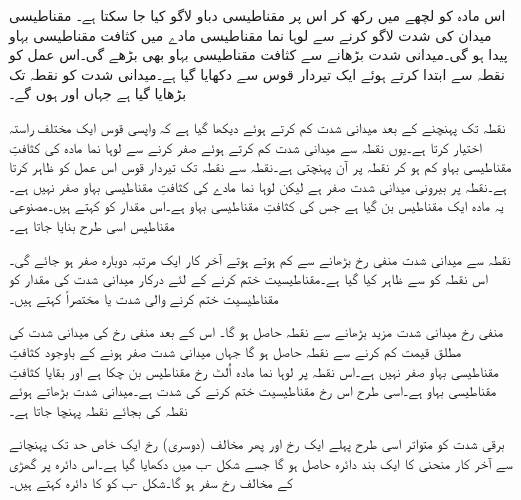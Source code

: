 اس مادہ کو لچھے میں رکھ کر اس پر مقناطیسی دباو لاگو کیا جا سکتا ہے۔ مقناطیسی میدان کی شدت   لاگو کرنے سے لوہا نما مقناطیسی مادے میں کثافت مقناطیسی بہاو   پیدا ہو گی۔میدانی شدت بڑھانے سے کثافت مقناطیسی بہاو بھی بڑھے گی۔اس عمل کو نقطہ   سے ابتدا کرتے ہوئے ایک تیردار قوس سے دکھایا گیا ہے۔میدانی شدت کو نقطہ   تک بڑھایا گیا ہے جہاں   اور  ہوں گے۔


نقطہ  تک پہنچنے کے بعد میدانی شدت کم کرتے ہوئے دیکھا گیا ہے کہ واپسی  قوس ایک مختلف راستہ اختیار کرتا ہے۔یوں نقطہ   سے میدانی شدت کم کرتے ہوئے صفر کرنے سے  لوہا نما مادہ کی کثافتِ مقناطیسی بہاو کم ہو کر نقطہ  پر آن پہنچتی ہے۔نقطہ  سے نقطہ  تک تیردار قوس اس عمل کو ظاہر کرتا ہے۔نقطہ  پر بیرونی میدانی شدت صفر ہے لیکن لوہا نما مادے کی کثافتِ مقناطیسی بہاو صفر نہیں ہے۔یہ مادہ ایک مقناطیس بن گیا ہے جس کی کثافتِ مقناطیسی بہاو   ہے۔اس مقدار کو   کہتے ہیں۔مصنوعی مقناطیس اسی طرح بنایا جاتا ہے۔

نقطہ  سے میدانی شدت منفی رخ  بڑھانے سے   کم ہوتے ہوتے آخر کار ایک مرتبہ دوبارہ صفر ہو جائے گی۔اس نقطہ کو  سے ظاہر کیا گیا ہے۔مقناطیسیت ختم کرنے کے لئے درکار میدانی شدت کی مقدار   کو مقناطیسیت ختم کرنے والی شدت یا مختصراً  کہتے ہیں۔

منفی رخ  میدانی شدت مزید بڑھانے سے  نقطہ  حاصل ہو گا۔ اس کے بعد منفی رخ  کی میدانی شدت کی مطلق قیمت کم کرنے سے  نقطہ  حاصل ہو گا جہاں میدانی شدت صفر ہونے کے باوجود کثافتِ مقناطیسی بہاو صفر نہیں ہے۔اس نقطہ پر لوہا نما مادہ اُلٹ رخ مقناطیس بن چکا ہے اور  بقایا کثافتِ مقناطیسی بہاو ہے۔اسی طرح اس رخ مقناطیسیت ختم کرنے کی شدت  ہے۔میدانی شدت بڑھاتے ہوئے نقطہ  کی بجائے   نقطہ  پہنچا جاتا ہے۔

برقی شدت کو متواتر اسی طرح پہلے ایک رخ اور پھر مخالف (دوسری) رخ  ایک خاص حد تک پہنچانے سے  آخر کار   منحنی کا ایک بند دائرہ حاصل ہو گا جسے شکل -ب میں دکھایا گیا ہے۔اس دائرہ پر گھڑی کے مخالف رخ سفر ہو گا۔شکل -ب کو   کا دائرہ  کہتے ہیں۔

